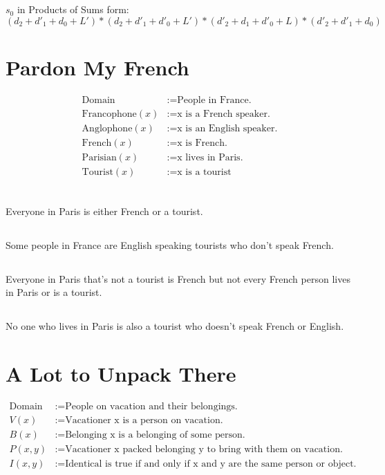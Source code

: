 \documentclass[11pt]{article}
\begin{document}
\subsection{} %
$s_0$ in Products of Sums form:
$(d_2+d'_1+d_0+L') * (d_2+d'_1+d'_0+L') * (d'_2+d_1+d'_0+L) * (d'_2+d'_1+d_0)$

\section{Pardon My French} %
\begin{align*}
	\text{Domain} &:= \text{People in France.} \\
	\text{Francophone}(x) &:= \text{x is a French speaker.} \\
	\text{Anglophone}(x) &:= \text{x is an English speaker.} \\
	\text{French}(x) &:= \text{x is French.} \\
	\text{Parisian}(x) &:= \text{x lives in Paris.} \\
	\text{Tourist}(x) &:= \text{x is a tourist} \\
\end{align*}
\subsection{} %
Everyone in Paris is either French or a tourist. 

\subsection{} %
Some people in France are English speaking tourists who don't speak French. 

\subsection{} %
Everyone in Paris that's not a tourist is French but not every French person lives in Paris or is a tourist. 

\subsection{} %
No one who lives in Paris is also a tourist who doesn't speak French or English. 

\section{A Lot to Unpack There} %
\begin{align*}
	\text{Domain} &:= \text{People on vacation and their belongings.} \\
	V(x) &:= \text{Vacationer x is a person on vacation.} \\
	B(x) &:= \text{Belonging x is a belonging of some person.} \\
	P(x, y) &:= \text{Vacationer x packed belonging y to bring with them on vacation.} \\
	I(x, y) &:= \text{Identical is true if and only if x and y are the same person or object.} \\
\end{align*}
\end{document}
